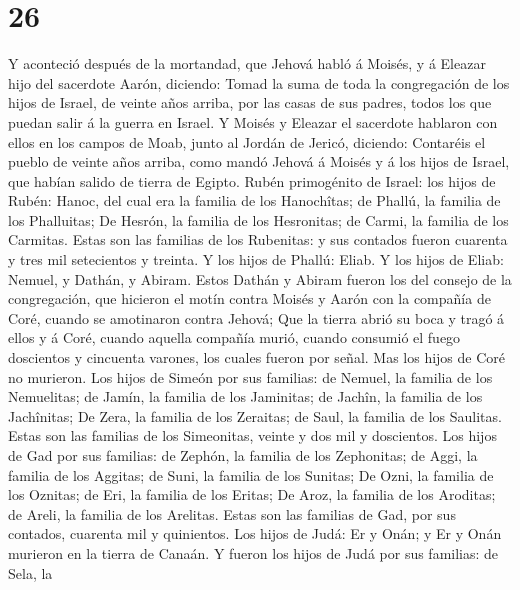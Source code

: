 \hypertarget{section-25}{%
\section{26}\label{section-25}}

 Y aconteció después de la mortandad, que Jehová habló á
Moisés, y á Eleazar hijo del sacerdote Aarón, diciendo: 
Tomad la suma de toda la congregación de los hijos de Israel, de veinte
años arriba, por las casas de sus padres, todos los que puedan salir á
la guerra en Israel.  Y Moisés y Eleazar el sacerdote
hablaron con ellos en los campos de Moab, junto al Jordán de Jericó,
diciendo:  Contaréis el pueblo de veinte años arriba, como
mandó Jehová á Moisés y á los hijos de Israel, que habían salido de
tierra de Egipto.  Rubén primogénito de Israel: los hijos de
Rubén: Hanoc, del cual era la familia de los Hanochîtas; de Phallú, la
familia de los Phalluitas;  De Hesrón, la familia de los
Hesronitas; de Carmi, la familia de los Carmitas.  Estas son
las familias de los Rubenitas: y sus contados fueron cuarenta y tres mil
setecientos y treinta.  Y los hijos de Phallú: Eliab.
 Y los hijos de Eliab: Nemuel, y Dathán, y Abiram. Estos
Dathán y Abiram fueron los del consejo de la congregación, que hicieron
el motín contra Moisés y Aarón con la compañía de Coré, cuando se
amotinaron contra Jehová;  Que la tierra abrió su boca y
tragó á ellos y á Coré, cuando aquella compañía murió, cuando consumió
el fuego doscientos y cincuenta varones, los cuales fueron por señal.
 Mas los hijos de Coré no murieron.  Los hijos
de Simeón por sus familias: de Nemuel, la familia de los Nemuelitas; de
Jamín, la familia de los Jaminitas; de Jachîn, la familia de los
Jachînitas;  De Zera, la familia de los Zeraitas; de Saul,
la familia de los Saulitas.  Estas son las familias de los
Simeonitas, veinte y dos mil y doscientos.  Los hijos de
Gad por sus familias: de Zephón, la familia de los Zephonitas; de Aggi,
la familia de los Aggitas; de Suni, la familia de los Sunitas;
 De Ozni, la familia de los Oznitas; de Eri, la familia de
los Eritas;  De Aroz, la familia de los Aroditas; de Areli,
la familia de los Arelitas.  Estas son las familias de Gad,
por sus contados, cuarenta mil y quinientos.  Los hijos de
Judá: Er y Onán; y Er y Onán murieron en la tierra de Canaán.
 Y fueron los hijos de Judá por sus familias: de Sela, la
